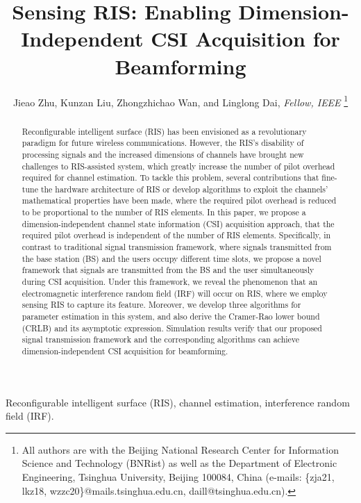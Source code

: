 \documentclass[12pt,draftclsnofoot,journal,onecolumn]{IEEEtran}
\theoremstyle{nonumberplain}
\begin{document}
\title{Sensing RIS: Enabling Dimension-Independent CSI Acquisition for Beamforming}
\author{{Jieao Zhu, Kunzan Liu, Zhongzhichao Wan, and Linglong Dai, {\textit{Fellow, IEEE}}
\vspace*{-3em}}
\thanks{All authors are with the Beijing National Research Center for Information Science and Technology (BNRist) as well as the Department of Electronic Engineering, Tsinghua University, Beijing 100084, China (e-mails: \{zja21, lkz18, wzzc20\}@mails.tsinghua.edu.cn, daill@tsinghua.edu.cn).}
}

\maketitle

\begin{abstract}
Reconfigurable intelligent surface (RIS) has been envisioned as a revolutionary paradigm for future wireless communications.
However, the RIS's disability of processing signals and the increased dimensions of channels have brought new challenges to RIS-assisted system, which greatly increase the number of pilot overhead required for channel estimation.
To tackle this problem, several contributions that fine-tune the hardware architecture of RIS or develop algorithms to exploit the channels' mathematical properties have been made, where the required pilot overhead is reduced to be proportional to the number of RIS elements.
In this paper, we propose a dimension-independent channel state information (CSI) acquisition approach, that the required pilot overhead is independent of the number of RIS elements.
Specifically, in contrast to traditional signal transmission framework, where signals transmitted from the base station (BS) and the users occupy different time slots, we propose a novel framework that signals are transmitted from the BS and the user simultaneously during CSI acquisition.
Under this framework, we reveal the phenomenon that an electromagnetic interference random field (IRF) will occur on RIS, where we employ sensing RIS to capture its feature.
Moreover, we develop three algorithms for parameter estimation in this system, and also derive the Cramer-Rao lower bound (CRLB) and its asymptotic expression.
Simulation results verify that our proposed signal transmission framework and the corresponding algorithms can achieve dimension-independent CSI acquisition for beamforming.
\end{abstract}

\begin{IEEEkeywords}
Reconfigurable intelligent surface (RIS), channel estimation, interference random field (IRF).
\end{IEEEkeywords}
\end{document}
